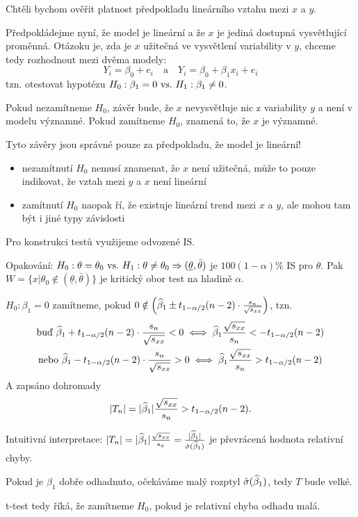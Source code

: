 Chtěli bychom ověřit platnost předpokladu lineárního vztahu mezi $x$ a $y$.

Předpokládejme nyní, že model je lineární a že $x$ je jediná dostupná vysvětlující proměnná. Otázoku je, zda je $x$ užitečná ve vysvětlení variability v $y$, chceme tedy rozhodnout mezi dvěma modely:
$$
	Y_i = \beta_0 + e_i \quad \text{a} \quad Y_i = \beta_0 + \beta_1 x_i + e_i
$$
tzn. otestovat hypotézu $H_0: \beta_1 = 0 ~\text{vs.}~ H_1: \beta_1 \neq 0$.

Pokud nezamítneme $H_0$, závěr bude, že $x$ nevysvětluje nic z variability $y$ a není v modelu významné. Pokud zamítneme $H_0$, znamená to, že $x$ je významné.

\begin{remark}
	Tyto závěry jsou správné pouze za předpokladu, že model je lineární!
	\begin{itemize}
		\item nezamítnutí $H_0$ nemusí znamenat, že $x$ není užitečná, může to pouze indikovat, že vztah mezi $y$ a $x$ není lineární
		\item zamítnutí $H_0$ naopak ří, že existuje lineární trend mezi $x$ a $y$, ale mohou tam být i jiné typy závislosti
	\end{itemize}
\end{remark}

Pro konstrukci testů využijeme odvozené IS.

\begin{remark}
	Opakování: $H_0: \theta = \theta_0 ~\text{vs.}~ H_1: \theta \neq \theta_0 \Rightarrow (\underline{\theta}, \bar{\theta})$ je $100(1-\alpha)\%$ IS pro $\theta$. Pak $W = \{ x | \theta_0 \notin (\underline{\theta}, \bar{\theta}) \}$ je kritický obor test na hladině $\alpha$.
\end{remark}

$H_0: \beta_1 = 0$ zamítneme, pokud $0 \notin \left( \widehat{\beta}_1 \pm t_{1-\alpha/2}(n-2) \cdot  \frac{s_n}{\sqrt{s_{xx}}} \right)$, tzn.
\begin{gather*}
	\text{buď } \widehat{\beta}_1 + t_{1-\alpha/2}(n-2) \cdot  \frac{s_n}{\sqrt{s_{xx}}} < 0 \iff  \widehat{\beta}_1 \frac{\sqrt{s_{xx}}}{s_n} < - t_{1-\alpha/2}(n-2) \\
	\text{nebo } \widehat{\beta}_1 - t_{1-\alpha/2}(n-2) \cdot  \frac{s_n}{\sqrt{s_{xx}}} > 0 \iff \widehat{\beta}_1 \frac{\sqrt{s_{xx}}}{s_n} > t_{1-\alpha/2}(n-2)
\end{gather*}
A zapsáno dohromady
$$
	|T_n| = |\widehat{\beta}_1| \frac{\sqrt{s_{xx}}}{s_n} > t_{1-\alpha/2}(n-2).
$$

\begin{remark}
	Intuitivní interpretace: $|T_n| = |\widehat{\beta}_1| \frac{\sqrt{s_{xx}}}{s_n} = \frac{|\widehat{\beta}_1|}{\hat{\sigma}(\widehat{\beta}_1)}$ je převrácená hodnota relativní chyby.
	
	Pokud je $\beta_1$ dobře odhadnuto, očekáváme malý rozptyl $\hat{\sigma}(\widehat{\beta}_1)$, tedy $T$ bude velké.
	
	t-test tedy říká, že zamítneme $H_0$, pokud je relativní chyba odhadu malá.
\end{remark}